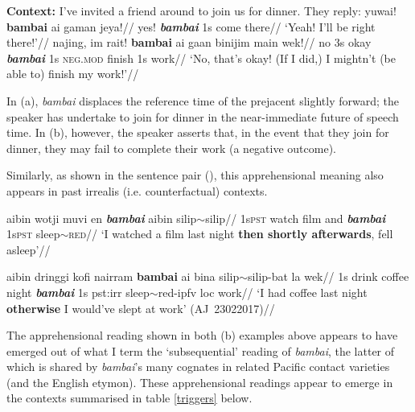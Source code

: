 \documentclass[12pt]{article}
\newcommand{\cb}[1]
 {\marginpar{\color{orange}\raggedleft\raggedright\hspace{0pt}\linespread{0.8}\footnotesize{#1}}}
\begin{document}
\pex\textbf{Context:} I've invited a friend around to join us for dinner. They reply:	
\a\begingl{}
\gla yuwai! \textbf{bambai} ai gaman jeya!//
\glb yes! \textit{\textbf{bambai}} 1s come there//
\glft `Yeah! I'll be right there!'//
\endgl
\a{}\begingl{}
\gla najing, im rait! \textbf{bambai} ai gaan binijim main wek!//
\glb no 3s okay \textit{\textbf{bambai}} 1s \textsc{neg.mod} finish 1s work//
\glft`No, that's okay! (If I did,) I mightn't (be able to) finish my work!'//
\endgl
	\xe

In (a), \textit{bambai} displaces the reference time of the prejacent slightly forward; the speaker has undertake to join for dinner in the near-immediate future of speech time. In (b), however, the speaker asserts that, in the event that they join for dinner, they may fail to complete their work (a negative outcome).

Similarly, as shown in the sentence pair (\nextx), this apprehensional meaning also appears in past irrealis (i.e. counterfactual) contexts.\cb{punctuation in free translations.}

\pex\a\begingl
\gla ai\textdblhyphen{}bin wotji muvi en \textbf{\textit{bambai}} aibin silip$\sim$silip//
\glb 1s\textdblhyphen\textsc{pst} watch film and \textit{\textbf{bambai}} 1s\textdblhyphen\textsc{pst} sleep$\sim$\textsc{red}//
\glft`I watched a film last night \textbf{then shortly afterwards}, fell asleep'//\endgl

\a {}\begingl
\gla ai\textdblhyphen{}bin dringgi kofi nairram \textbf{bambai} ai bina silip$\sim$silip-bat la wek//
\glb 1s drink coffee night \textit{\textbf{bambai}} 1s {\sc pst:irr} sleep{\sc$\sim$red-ipfv} {\sc loc} work//
\glft`I had coffee last night \textbf{otherwise} I would've slept at work' \hspace*{\fill}(AJ~23022017)//\endgl
\xe

The apprehensional reading shown in both (b) examples above appears to have emerged out of what I term the `subsequential' reading of \textit{bambai}, the latter of which is shared by \textit{bambai}'s many cognates in related Pacific contact varieties (and the English etymon). These apprehensional readings appear to emerge in the contexts summarised in table \ref{triggers} below.
\end{document}
